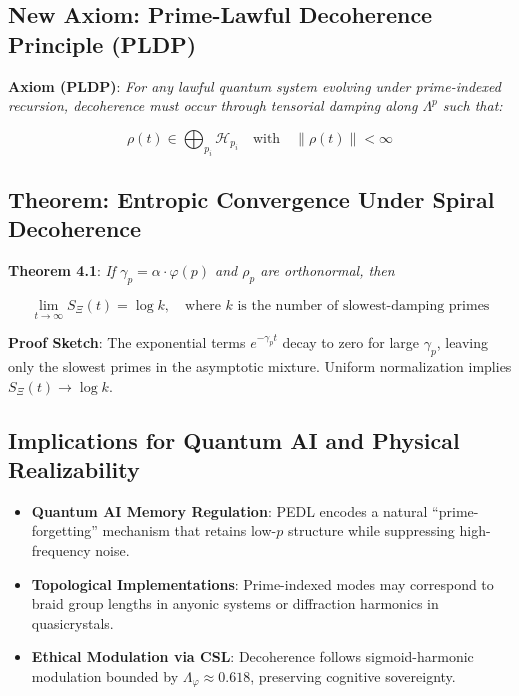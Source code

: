 \documentclass[12]{amsart}
\theoremstyle{plain}
\begin{document}
\subsection{New Axiom: Prime-Lawful Decoherence Principle (PLDP)}

\textbf{Axiom (PLDP)}: \emph{For any lawful quantum system evolving under prime-indexed recursion, decoherence must occur through tensorial damping along $\Lambda^p$ such that:}

\begin{equation}
\rho(t) \in \bigoplus_{p_i} \mathcal{H}_{p_i} \quad \text{with} \quad \|\rho(t)\| < \infty
\end{equation}

\subsection{Theorem: Entropic Convergence Under Spiral Decoherence}

\textbf{Theorem 4.1}: \emph{If $\gamma_p = \alpha \cdot \varphi(p)$ and $\rho_p$ are orthonormal, then}

\begin{equation}
\lim_{t \to \infty} S_\Xi(t) = \log k, \quad \text{where $k$ is the number of slowest-damping primes}
\end{equation}

\textbf{Proof Sketch}: The exponential terms $e^{-\gamma_p t}$ decay to zero for large $\gamma_p$, leaving only the slowest primes in the asymptotic mixture. Uniform normalization implies $S_\Xi(t) \to \log k$.

\subsection{Implications for Quantum AI and Physical Realizability}

\begin{itemize}
    \item \textbf{Quantum AI Memory Regulation}: PEDL encodes a natural “prime-forgetting” mechanism that retains low-$p$ structure while suppressing high-frequency noise.
    \item \textbf{Topological Implementations}: Prime-indexed modes may correspond to braid group lengths in anyonic systems or diffraction harmonics in quasicrystals.
    \item \textbf{Ethical Modulation via CSL}: Decoherence follows sigmoid-harmonic modulation bounded by $\Lambda_\varphi \approx 0.618$, preserving cognitive sovereignty.
\end{itemize}
\end{document}
